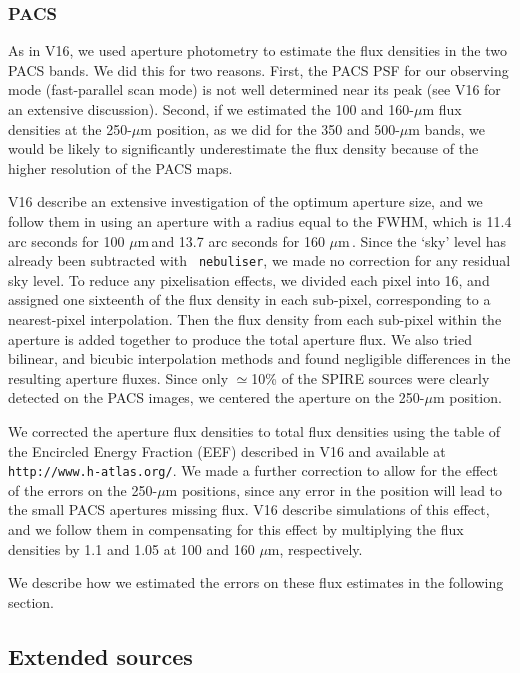 \documentclass[useAMS,usenatbib]{mnras}
\def\mic{ $\mu $m\,}
\begin{document}
\subsubsection{PACS}

As in V16, we used aperture photometry to estimate the
flux densities in the two PACS bands. We did this for
two reasons. First, the
PACS PSF for our observing mode
(fast-parallel scan mode)
is not well determined near its peak (see V16 for an
extensive discussion). Second, if we estimated the 100 and
160-$\mu$m flux densities at the 250-$\mu$m position, as we
did for the 350 and 500-$\mu$m bands, we would be likely
to significantly underestimate the flux density because of
the higher resolution of the PACS maps.

V16 describe an extensive investigation of the optimum aperture size,
and we follow them in using an aperture with a radius equal to the
FWHM, which is 11.4 arc seconds for 100\mic and 13.7 arc seconds for
160\mic. Since the `sky' level has already been subtracted with {\tt
  nebuliser}, we made no correction for any residual sky level.  To
reduce any pixelisation effects, we divided each pixel into 16, and
assigned one sixteenth of the flux density in each sub-pixel,
corresponding to a nearest-pixel interpolation. Then the flux density
from each sub-pixel within the aperture is added together to produce
the total aperture flux.  We also tried bilinear, and bicubic
interpolation methods and found negligible differences in the
resulting aperture fluxes.  Since only $\simeq$10\% of the SPIRE
sources were clearly detected on the PACS images, we centered the
aperture on the 250-$\mu$m position.

We corrected the aperture flux densities to total flux densities using
the table of the Encircled Energy Fraction (EEF) described in V16 and
available at {\tt http://www.h-atlas.org/}.  We made a further
correction to allow for the effect of the errors on the 250-$\mu$m
positions, since any error in the position will lead to the small PACS
apertures missing flux. V16 describe simulations of this effect, and
we follow them in compensating for this effect by multiplying the flux
densities by 1.1 and 1.05 at 100 and 160 $\mu$m, respectively.

We describe how we estimated the errors on these flux estimates in the
following section.

\subsection{Extended sources} 
\end{document}
